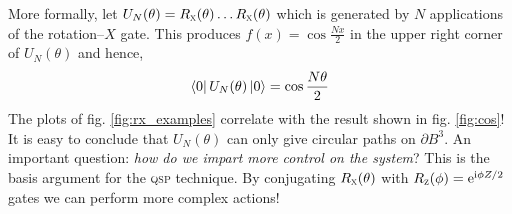 \documentclass{article}
\begin{document}
More formally, let $U_N(\theta) = R_{\textsc{x}}(\theta)\ldots R_{\textsc{x}}(\theta)$ which is generated by $N$ applications of the rotation--$X$ gate. This produces $f(x)=\cos \frac{Nx}{2}$ in the upper right corner of $U_N(\theta)$ and hence,
\begin{equation}
    \bra{0}U_N(\theta)\ket{0} = \cos\frac{N\theta}{2}
\end{equation}
The plots of fig. \ref{fig:rx_examples} correlate with the result shown in fig. \ref{fig:cos}! It is easy to conclude that $U_N(\theta)$ can only give circular paths on $\partial B^3$. An important question: \emph{how do we impart more control on the system}? This is the basis argument for the \textsc{qsp} technique. By conjugating $R_{\textsc{x}}(\theta)$ with $R_{\textsc{z}}(\phi) = \mathrm{e}^{\mathrm{i} \phi Z/2}$ gates we can perform more complex actions!
\end{document}
